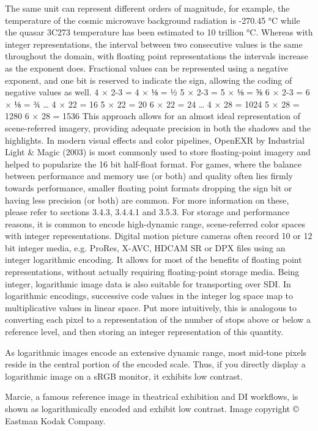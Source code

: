 The same unit can represent different orders of magnitude, for example, the temperature of the cosmic microwave background radiation is -270.45 °C while the quasar 3C273 temperature has been estimated to 10 trillion °C. Whereas with integer representations, the interval between two consecutive values is the same throughout the domain, with floating point representations the intervals increase as the exponent does. Fractional values can be represented using a negative exponent, and one bit is reserved to indicate the sign, allowing the coding of negative values as well.
4 × 2-3 = 4 × ⅛ = ½
5 × 2-3 = 5 × ⅛ = ⅝
6 × 2-3 = 6 × ⅛ = ¾
…
4 × 22 = 16
5 × 22 = 20
6 × 22 = 24
…
4 × 28 = 1024
5 × 28 = 1280
6 × 28 = 1536
This approach allows for an almost ideal representation of scene-referred imagery, providing adequate precision in both the shadows and the highlights. In modern visual effects and color pipelines, OpenEXR by Industrial Light & Magic (2003) is most commonly used to store floating-point imagery and helped to popularize the 16 bit half-float format.
For games, where the balance between performance and memory use (or both) and quality often lies firmly towards performance, smaller floating point formats dropping the sign bit or having less precision (or both) are common. For more information on these, please refer to sections 3.4.3, 3.4.4.1 and 3.5.3.
For storage and performance reasons, it is common to encode high-dynamic range, scene-referred color spaces with integer representations. Digital motion picture cameras often record 10 or 12 bit integer media, e.g. ProRes, X-AVC, HDCAM SR or DPX files using an integer logarithmic encoding. It allows for most of the benefits of floating point representations, without actually requiring floating-point storage media. Being integer, logarithmic image data is also suitable for transporting over SDI. In logarithmic encodings, successive code values in the integer log space map to multiplicative values in linear space. Put more intuitively, this is analogous to converting each pixel to a representation of the number of stops above or below a reference level, and then storing an integer representation of this quantity.

As logarithmic images encode an extensive dynamic range, most mid-tone pixels reside in the central portion of the encoded scale. Thus, if you directly display a logarithmic image on a sRGB monitor, it exhibits low contrast.

Marcie, a famous reference image in theatrical exhibition and DI workflows, is shown as logarithmically encoded and exhibit low contrast. Image copyright © Eastman Kodak Company.

